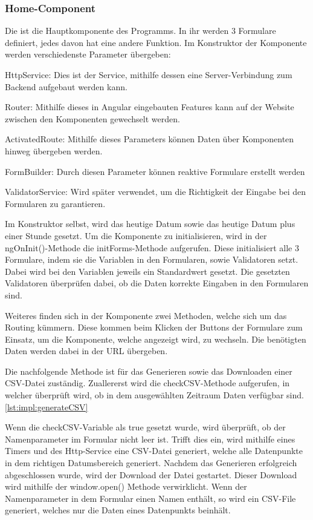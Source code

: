 \subsubsection{Home-Component}
Die ist die Hauptkomponente des Programms. In ihr werden 3 Formulare definiert, jedes davon hat eine andere Funktion. Im Konstruktor der Komponente werden verschiedenste Parameter übergeben:
 
\begin{compactitem}
    \item HttpService: Dies ist der Service, mithilfe dessen eine Server-Verbindung zum Backend aufgebaut werden kann.   
    \item Router: Mithilfe dieses in Angular eingebauten Features kann auf der Website zwischen den Komponenten gewechselt werden.       
    \item ActivatedRoute: Mithilfe dieses Parameters können Daten über Komponenten hinweg übergeben werden.   
    \item FormBuilder: Durch diesen Parameter können reaktive Formulare erstellt werden
    \item ValidatorService: Wird später verwendet, um die Richtigkeit der Eingabe bei den Formularen zu garantieren.
\end{compactitem}
 
Im Konstruktor selbst, wird das heutige Datum sowie das heutige Datum plus einer Stunde gesetzt.
Um die Komponente zu initialisieren, wird in der ngOnInit()-Methode die initForms-Methode aufgerufen. Diese initialisiert alle 3 Formulare, indem sie die Variablen in den Formularen, sowie Validatoren setzt. Dabei wird bei den Variablen jeweils ein Standardwert gesetzt. Die gesetzten Validatoren überprüfen dabei, ob die Daten korrekte Eingaben in den Formularen sind.
 
Weiteres finden sich in der Komponente zwei Methoden, welche sich um das Routing kümmern. Diese kommen beim Klicken der Buttons der Formulare zum Einsatz, um die Komponente, welche angezeigt wird, zu wechseln. Die benötigten Daten werden dabei in der URL übergeben.
 
Die nachfolgende Methode ist für das Generieren sowie das Downloaden einer CSV-Datei zuständig. Zuallererst wird die checkCSV-Methode aufgerufen, in welcher überprüft wird, ob in dem ausgewählten Zeitraum Daten verfügbar sind. \ref{lst:impl:generateCSV}

Wenn die checkCSV-Variable als true gesetzt wurde, wird überprüft, ob der Namenparameter im Formular nicht leer ist. Trifft dies ein, wird mithilfe eines Timers und des Http-Service eine CSV-Datei generiert, welche alle Datenpunkte in dem richtigen Datumsbereich generiert. Nachdem das Generieren erfolgreich abgeschlossen wurde, wird der Download der Datei gestartet. Dieser Download wird mithilfe der window.open() Methode verwirklicht. Wenn der Namenparameter in dem Formular einen Namen enthält, so wird ein CSV-File generiert, welches nur die Daten eines Datenpunkts beinhält.
 
